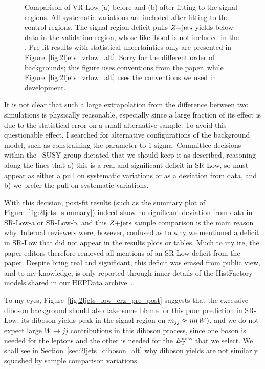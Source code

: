 \begin{figure}[tp]
\begin{subfigure}{0.48\textwidth}
\end{subfigure}
\caption[
Comparison of VR-Low before and after fitting to the signal regions
]{%
Comparison of VR-Low (a) before and (b) after fitting to the signal regions.
All systematic variations are included after fitting to the control regions.
The signal region deficit pulls $Z\mathrm{+jets}$ yields below data in the validation
region, whose likelihood is not included in the \heplikelihood.
Pre-fit results with statistical uncertainties only are presented in
Figure~\ref{fig:2ljets_vrlow_alt}.
Sorry for the different order of backgrounds; this figure uses
conventions from the paper, while Figure~\ref{fig:2ljets_vrlow_alt}
uses the conventions we used in development.
}
\label{fig:2ljets_low_vrlow_pre_post}
\end{figure}

It is not clear that such a large extrapolation from the difference between
two simulations is physically reasonable, especially since a large fraction
of its effect is due to the statistical error on a small alternative sample.
To avoid this questionable effect, I searched for alternative configurations
of the background model, such as constraining the parameter to $1$-sigma.
Committee decisions within the \atlas\ SUSY group dictated that we should keep
it as described, reasoning along the lines that
a) this is a real and significant deficit in SR-Low, so must appear as either
a pull on systematic variations or as a deviation from data, and
b) we prefer the pull on systematic variations.

With this decision, post-fit results (such as the summary plot of
Figure~\ref{fig:2ljets_summary})
indeed show no significant deviation from data in SR-Low-a or SR-Low-b,
and this $Z\mathrm{+jets}$ sample comparison is the main reason why.
Internal reviewers were, however, confused as to why we mentioned a deficit in
SR-Low that did not appear in the results plots or tables.
Much to my ire, the paper editors therefore removed all mentions of an SR-Low
deficit from the paper.
Despite bring real and significant, this deficit was erased from public view,
and to my knowledge, is only reported through inner details of
the HistFactory models shared in our HEPData archive~\cite{hepdata.116034}.

To my eyes, Figure~\ref{fig:2ljets_low_crz_pre_post} suggests that the
excessive diboson background should also take some blame for this poor
prediction in SR-Low;
its diboson yields peak in the signal region on $m_{jj} \approx m(W)$, and
we do not expect large $W\rightarrow jj$ contributions in this diboson process,
since one boson is needed for the leptons and the other is needed for the
$E_\mathrm{T}^\mathrm{miss}$ that we select.
We shall see in Section~\ref{sec:2ljets_diboson_alt} why diboson yields are
not similarly squashed by sample comparison variations.


